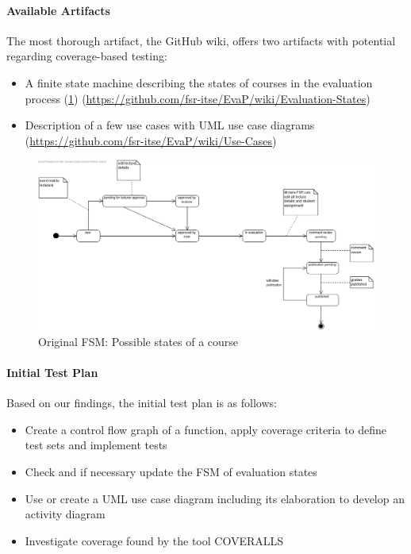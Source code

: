 \paragraph{Available Artifacts}
The most thorough artifact, the GitHub wiki, offers two artifacts with potential regarding coverage-based testing:
\begin{itemize}
    \item A finite state machine describing the states of courses in the evaluation process (\ref{fig:original-states}) (\url{https://github.com/fsr-itse/EvaP/wiki/Evaluation-States})
    \item Description of a few use cases with UML use case diagrams (\url{https://github.com/fsr-itse/EvaP/wiki/Use-Cases})
\end{itemize}
\begin{figure}[h]
    \centering
    \includegraphics[width=\textwidth, keepaspectratio]{graphics/original_states_of_a_course}
    \caption{Original FSM: Possible states of a course}
    \label{fig:original-states}
\end{figure}

\paragraph{Initial Test Plan}
Based on our findings, the initial test plan is as follows:
\begin{itemize}
    \item Create a control flow graph of a function, apply coverage criteria to define test sets and implement tests
    \item Check and if necessary update the FSM of evaluation states
    \item Use or create a UML use case diagram including its elaboration to develop an activity diagram
    \item Investigate coverage found by the tool COVERALLS
\end{itemize}
